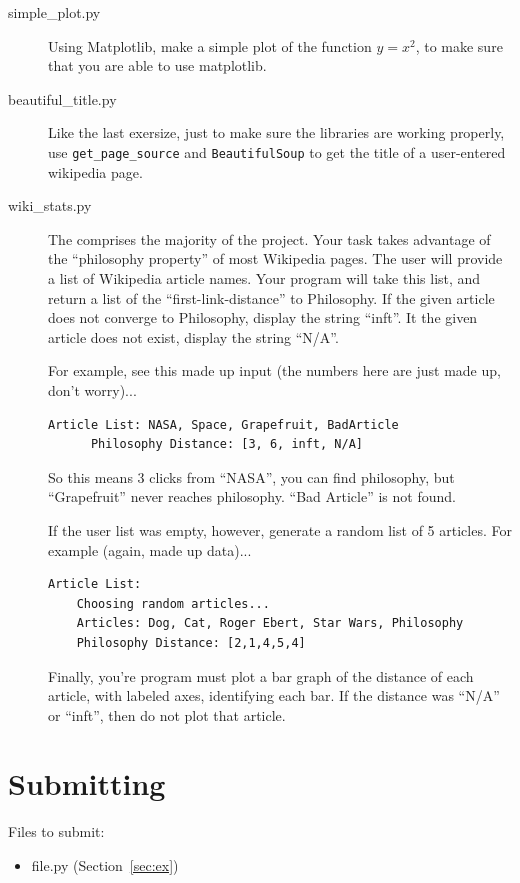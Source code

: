 \documentclass[11pt]{cselabheader}
\begin{document}
\begin{description}
  \item[simple\_plot.py] Using Matplotlib, make a simple plot of the function
    $y=x^2$, to make sure that you are able to use matplotlib.
  \item[beautiful\_title.py] Like the last exersize, just to make sure the libraries
    are working properly, use \texttt{get\_page\_source} and \texttt{BeautifulSoup}
    to get the title of a user-entered wikipedia page.
  \item[wiki\_stats.py] The comprises the majority of the project. Your task takes
    advantage of the ``philosophy property'' of most Wikipedia pages. The user
    will provide a list of Wikipedia article names. Your program will take this
    list, and return a list of the ``first-link-distance'' to Philosophy. If
    the given article does not converge to Philosophy, display the string ``inft''.
    It the given article does not exist, display the string ``N/A''.

    For example, see this made up input (the numbers here are just made up, don't
    worry)...
    \begin{lstlisting}[style=bash]
      Article List: NASA, Space, Grapefruit, BadArticle
      Philosophy Distance: [3, 6, inft, N/A]
    \end{lstlisting}
  So this means 3 clicks from ``NASA'', you can find philosophy, but ``Grapefruit''
  never reaches philosophy. ``Bad Article'' is not found.

  If the user list was empty, however, generate a random list of 5 articles. For
  example (again, made up data)...
  \begin{lstlisting}[style=bash]
    Article List:
    Choosing random articles...
    Articles: Dog, Cat, Roger Ebert, Star Wars, Philosophy
    Philosophy Distance: [2,1,4,5,4]
  \end{lstlisting}

  Finally, you're program must plot a bar graph of the distance of each article,
  with labeled axes, identifying each bar. If the distance was ``N/A'' or ``inft'',
  then do not plot that article.
\end{description}

\pagebreak
\section{Submitting}

Files to submit:
\begin{itemize}
\item file.py (Section~\ref{sec:ex})
\end{itemize}
\end{document}
